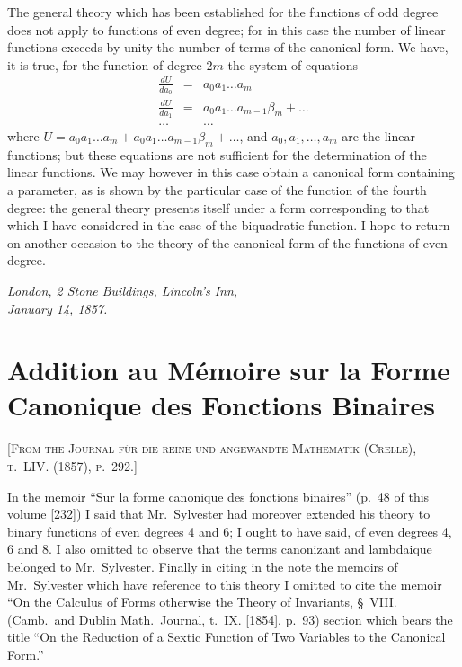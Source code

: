 \documentclass[11pt,a4paper]{book}
\begin{document}
The general theory which has been established for the functions of odd degree does not apply to functions of even degree; for in this case the number of linear functions exceeds by unity the number of terms of the canonical form. We have, it is true, for the function of degree $2m$ the system of equations
\[
\renewcommand{\arraystretch}{1.2}
\begin{array}{rcl}
\frac{dU}{da_0} &=& a_0 a_1 \ldots a_m \\
\frac{dU}{da_1} &=& a_0 a_1 \ldots a_{m-1} \beta_m + \ldots \\
\ldots  & &  \ldots
\end{array}
\]
where $U = a_0a_1\ldots a_m + a_0a_1\ldots a_{m-1}\beta_m + \ldots$, and $a_0, a_1, \ldots, a_m$ are the linear functions; but these equations are not sufficient for the determination of the linear functions. We may however in this case obtain a canonical form containing a parameter, as is shown by the particular case of the function of the fourth degree: the general theory presents itself under a form corresponding to that which I have considered in the case of the biquadratic function. I hope to return on another occasion to the theory of the canonical form of the functions of even degree.

\medskip
\noindent\textit{London, 2 Stone Buildings, Lincoln's Inn,\\January 14, 1857.}

\newpage


\section{Addition au Mémoire sur la Forme Canonique des Fonctions Binaires}

\textsc{[From the Journal für die reine und angewandte Mathematik (Crelle), t.~LIV. (1857), p.~292.]}
\label{paper:233}

\setcounter{page}{53}

In the memoir ``Sur la forme canonique des fonctions binaires'' (p.~48 of this volume [232]) I said that Mr.~Sylvester had moreover extended his theory to binary functions of even degrees 4 and 6; I ought to have said, of even degrees 4, 6 and 8. I also omitted to observe that the terms canonizant and lambdaique belonged to Mr.~Sylvester. Finally in citing in the note the memoirs of Mr.~Sylvester which have reference to this theory I omitted to cite the memoir ``On the Calculus of Forms otherwise the Theory of Invariants, \S~VIII. (Camb.\ and Dublin Math.\ Journal, t.~IX. [1854], p.~93) section which bears the title ``On the Reduction of a Sextic Function of Two Variables to the Canonical Form.''
\end{document}
